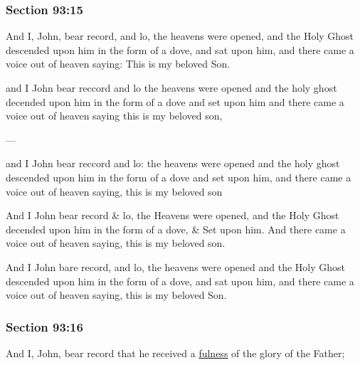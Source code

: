 	\subsubsection{Section 93:15} %
		\label{DC93-15}

		And I, John, bear record, and lo, the heavens were opened, and the Holy Ghost descended upon him in the form of a dove, and sat upon him, and there came a voice out of heaven saying: This is my beloved Son.

		\begin{framed}
		\scriptsize
			\begin{compactdesc}
				\item[JSP] and I John bear reccord and lo the heavens were opened and the holy ghost decended upon him in the form of a dove and set upon him and there came a voice out of heaven saying this is my beloved son,
				\item[BC] ---
				\item[RB2] and I John bear reccord and lo: the heavens were opened and the holy ghost descended upon him in the form of a dove and set upon him, and there came a voice out of heaven saying, this is my beloved son
				\item[RB1] And I John bear record \& lo, the Heavens were opened, and the Holy Ghost decended upon him in the form of a dove, \& Set upon him. And there came a voice out of heaven saying, this is my beloved son. 
				\item[DC 1835] And I John bare record, and lo, the heavens were opened and the Holy Ghost descended upon him in the form of a dove, and sat upon him, and there came a voice out of heaven saying, this is my beloved Son. 
			\end{compactdesc}
		\end{framed}

	\subsubsection{Section 93:16} %
		\label{DC93-16}

		And I, John, bear record that he received a \hyperref[FULNESS]{fulness} of the glory of the Father;


